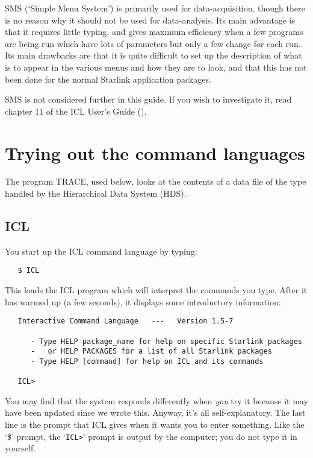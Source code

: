 SMS (`Simple Menu System') is primarily used for data-acquisition, though
there is no reason why it should not be used for data-analysis.
Its main advantage is that it requires little typing, and gives maximum
efficiency when a few programs are being run which have lots of
parameters but only a few change for each run.
Its main drawbacks are that it is quite difficult to set up the description of
what is to appear in the various menus and how they are to look, and that this
has not been done for the normal Starlink application packages.

SMS is not considered further in this guide.
If you wish to investigate it, read chapter 11 of the ICL User's Guide
().

\section{Trying out the command languages}
\label{S_trycl}

The program TRACE, used below, looks at the contents of a data file of the
type handled by the Hierarchical Data System (HDS).

\subsection{ICL}

You start up the ICL command language by typing:

\begin{small}
\begin{verbatim}
   $ ICL
\end{verbatim}
\end{small}

This loads the ICL program which will interpret the commands you type.
After it has warmed up (a few seconds), it displays some introductory
information:

\begin{small}
\begin{verbatim}
   Interactive Command Language   ---   Version 1.5-7

      - Type HELP package_name for help on specific Starlink packages
      -   or HELP PACKAGES for a list of all Starlink packages
      - Type HELP [command] for help on ICL and its commands

   ICL>
\end{verbatim}
\end{small}

You may find that the system responds differently when {\em you} try it
because it may have been updated since we wrote this.
Anyway, it's all self-explanatory.
The last line is the prompt that ICL gives when it wants you to enter something.
Like the `\$' prompt, the `\verb+ICL>+' prompt is output by the computer; you do
not type it in yourself.

